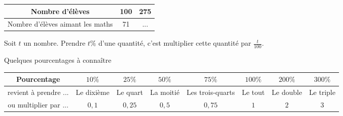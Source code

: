 \begin{pageCours}
\begin{Pp}
\begin{center}
\begin{tabular}{c|c|c}
Nombre d'élèves & 100 & 275 \\\hline
Nombre d'élèves aimant les maths & 71 & ... \\
\end{tabular}
\end{center}
\end{Pp}

\begin{Pp}
Soit $t$ un nombre. Prendre $t\%$ d'une quantité, c'est multiplier cette quantité par $\frac{t}{100}$.
\end{Pp}

Quelques pourcentages à connaître
\begin{center}
\begin{tabular}{c||c|c|c|c|c|c|c}
Pourcentage & $10\%$ & $25\%$ & $50\%$ & $75\%$ & $100\%$ & $200\%$ & $300\%$ \\\hline
revient à prendre ... & Le dixième & Le quart & La moitié & Les trois-quarts & Le tout & Le double & Le triple \\\hline
ou multiplier par ... & $0,1$ & $0,25$ & $0,5$ & $0,75$ & $1$ & $2$ & $3$ \\
\end{tabular}
\end{center}






\end{pageCours}
